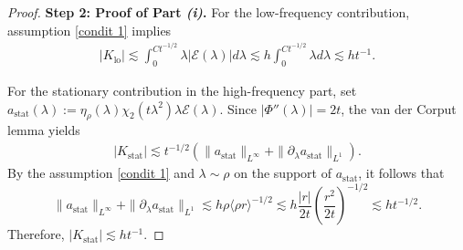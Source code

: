 \documentclass[reqno]{amsart}
\numberwithin{equation}{section}
\begin{document}
\begin{proof}
	\medskip
	
	\textbf{Step 2: Proof of Part \emph{(i)}.}
	For the low-frequency contribution, assumption \eqref{condit 1}
	implies
	$$
	\begin{aligned}
		|K_{\mathrm{lo}}|
		\lesssim
		\int_0^{Ct^{-1/2}}
		\lambda|\mathcal E(\lambda)| d\lambda 
		\lesssim
		h\int_0^{Ct^{-1/2}}\lambda d\lambda 
		\lesssim
		ht^{-1}.
	\end{aligned}
	$$
	
	For the stationary contribution in the high-frequency part, set
	$
	a_{\mathrm{stat}}(\lambda)
	:=
	\eta_\rho(\lambda)
	\chi_2(t\lambda^2)
	\lambda\mathcal E(\lambda).
	$
	Since $|\Phi''(\lambda)|=2t$, the van der Corput lemma yields
	\begin{align}\label{van-1}
	|K_{\mathrm{stat}}|
	\lesssim
	t^{-1/2}
	\left(
	\|a_{\mathrm{stat}}\|_{L^\infty}
	+
	\|\partial_\lambda a_{\mathrm{stat}}\|_{L^1}
	\right).
	\end{align}
	By the
	assumption \eqref{condit 1} and $\lambda\sim\rho$ on the support of $a_{\mathrm{stat}}$, it follows that
	$$
	\|a_{\mathrm{stat}}\|_{L^\infty}
	+
	\|\partial_\lambda a_{\mathrm{stat}}\|_{L^1}
	\lesssim
	h\rho
	\langle\rho r\rangle^{-1/2}\lesssim h  \frac{|r|}{2t} \left(\frac{r^2}{2t}\right)^{-1/2} \lesssim h t^{-1/2}.
	$$
	Therefore,
	$
	|K_{\mathrm{stat}}|
	\lesssim
	ht^{-1}.
	$
    

\end{proof}
\end{document}
